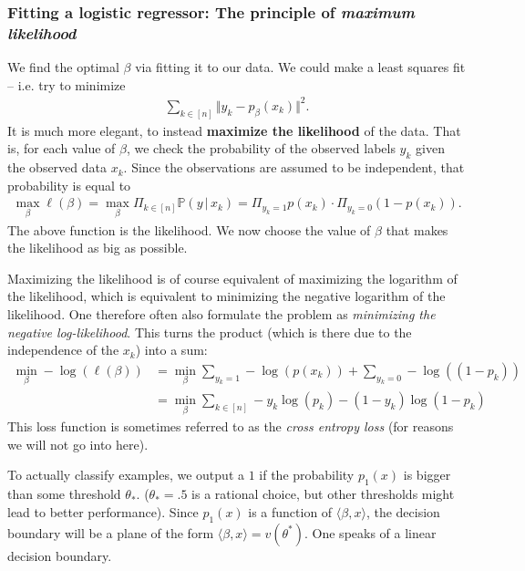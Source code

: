 \documentclass{article}
\newcommand{\sprod}[1]{\langle #1 \rangle}
\newcommand{\norm}[1]{\Vert #1 \Vert}
\begin{document}
\subsubsection{Fitting a logistic regressor: The principle of \emph{maximum likelihood}}
We find the optimal $\beta$ via fitting it to our data. We could make a least squares fit -- i.e. try to minimize
\begin{align*}
    \sum_{k\in [n]} \norm{y_k - p_\beta(x_k)}^2.
\end{align*}
It is much more elegant, to instead \textbf{maximize the likelihood} of the data. That is, for each value of $\beta$, we check the probability of the observed labels $y_k$ given the observed data $x_k$. Since the observations are assumed to be independent, that probability is equal to
\begin{align*}
    \max_\beta \ell(\beta) =  \max_\beta \Pi_{k \in [n]} \mathbb{P}(y \,\vert \, x_k) = \Pi_{y_k =1} p(x_k)\cdot \Pi_{y_k=0} (1-p(x_k)).
\end{align*}
The above function is the likelihood. We now choose the value of $\beta$ that makes the likelihood as big as possible. 

Maximizing the likelihood is of course equivalent of maximizing the logarithm of the likelihood, which is equivalent to minimizing the negative logarithm of the likelihood. One therefore often also formulate the problem as \emph{minimizing the negative log-likelihood}. This turns the product (which is there due to the independence of the $x_k$) into a sum:
\begin{align*}
    \min_{\beta} - \log(\ell(\beta)) &= \min_\beta \sum_{y_k=1} -\log(p(x_k)) + \sum_{y_k=0} -\log((1-p_k)) \\
    &= \min_\beta \sum_{k \in [n]} -y_k\log(p_k)-(1-y_k)\log(1-p_k) 
\end{align*}
This loss function is sometimes referred to as the \emph{cross entropy loss} (for reasons we will not go into here).

To actually classify examples, we output a $1$ if the probability $p_1(x)$ is bigger than some threshold $\theta_*$. ($\theta_*=.5$ is a rational choice, but other thresholds might lead to better performance). Since $p_1(x)$ is a function of $\sprod{\beta,x}$, the decision boundary will be a plane of the form $\sprod{\beta,x}=v(\theta^*)$. One speaks of a linear decision boundary.
\end{document}
